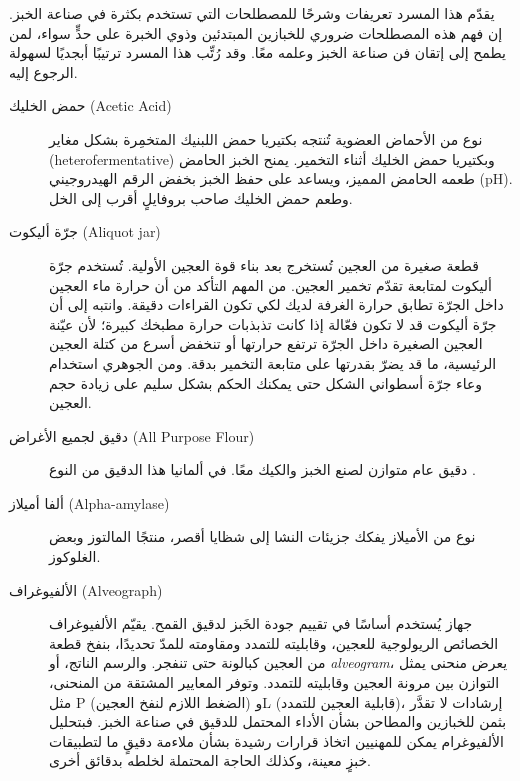 \begin{quoting}
يقدّم هذا المسرد تعريفات وشرحًا للمصطلحات التي تستخدم بكثرة في صناعة الخبز. إن فهم هذه المصطلحات ضروري للخبازين المبتدئين وذوي الخبرة على حدٍّ سواء، لمن يطمح إلى إتقان فن صناعة الخبز وعلمه معًا. وقد رُتِّب هذا المسرد ترتيبًا أبجديًا لسهولة الرجوع إليه.
\end{quoting}

\begin{description}

\item[حمض الخليك \textenglish{(Acetic Acid)}]
نوع من الأحماض العضوية تُنتجه بكتيريا حمض اللبنيك المتخمِرة بشكل مغاير \textenglish{(heterofermentative)} وبكتيريا حمض الخليك أثناء التخمير. يمنح الخبز الحامض طعمه الحامض المميز، ويساعد على حفظ الخبز بخفض الرقم الهيدروجيني \textenglish{(pH)}. وطعم حمض الخليك صاحب بروفايلٍ أقرب إلى الخل.

\item[جرّة أليكوت \textenglish{(Aliquot jar)}]
قطعة صغيرة من العجين تُستخرج بعد بناء قوة العجين الأولية. تُستخدم جرّة أليكوت لمتابعة تقدّم تخمير العجين. من المهم التأكد من أن حرارة ماء العجين داخل الجرّة تطابق حرارة الغرفة لديك لكي تكون القراءات دقيقة. وانتبه إلى أن جرّة أليكوت قد لا تكون فعّالة إذا كانت تذبذبات حرارة مطبخك كبيرة؛ لأن عيّنة العجين الصغيرة داخل الجرّة ترتفع حرارتها أو تنخفض أسرع من كتلة العجين الرئيسية، ما قد يضرّ بقدرتها على متابعة التخمير بدقة. ومن الجوهري استخدام وعاء جرّة أسطواني الشكل حتى يمكنك الحكم بشكل سليم على زيادة حجم العجين.

\item[دقيق لجميع الأغراض \textenglish{(All Purpose Flour)}]
دقيق عام متوازن لصنع الخبز والكيك معًا. في ألمانيا هذا الدقيق من النوع .

\item[ألفا أميلاز \textenglish{(Alpha-amylase)}]
نوع من الأميلاز يفكك جزيئات النشا إلى شظايا أقصر، منتجًا المالتوز وبعض الغلوكوز.

\item[الألفيوغراف \textenglish{(Alveograph)}]
جهاز يُستخدم أساسًا في تقييم جودة الخَبز لدقيق القمح. يقيّم الألفيوغراف الخصائص الريولوجية للعجين، وقابليته للتمدد ومقاومته للمدّ تحديدًا، بنفخ قطعة من العجين كبالونة حتى تنفجر. والرسم الناتج، أو \textenglish{\emph{alveogram}}، يعرض منحنى يمثل التوازن بين مرونة العجين وقابليته للتمدد. وتوفر المعايير المشتقة من المنحنى، مثل \textenglish{P} (الضغط اللازم لنفخ العجين) و\textenglish{L} (قابلية العجين للتمدد)، إرشادات لا تقدَّر بثمن للخبازين والمطاحن بشأن الأداء المحتمل للدقيق في صناعة الخبز. فبتحليل الألفيوغرام يمكن للمهنيين اتخاذ قرارات رشيدة بشأن ملاءمة دقيقٍ ما لتطبيقات خبزٍ معينة، وكذلك الحاجة المحتملة لخلطه بدقائق أخرى.


\end{description}

